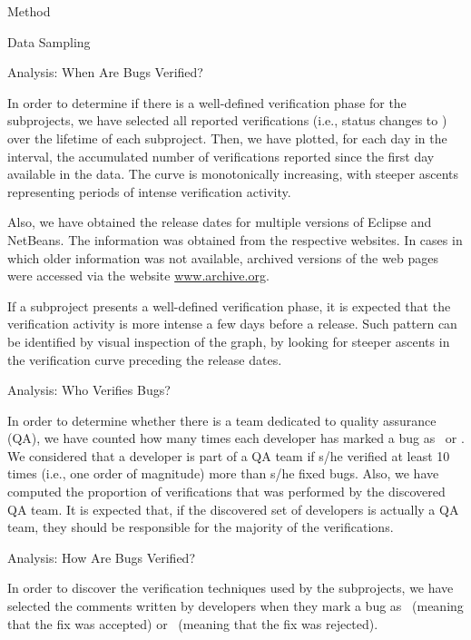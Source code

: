 \begin{section}{Method}
\begin{subsection}{Data Sampling}
\end{subsection}

\begin{subsection}{Analysis: When Are Bugs Verified?}
	
	In order to determine if there is a well-defined verification phase for the subprojects, we have selected all reported verifications (i.e., status changes to \VERIFIED) over the lifetime of each subproject. Then, we have plotted, for each day in the interval, the accumulated number of verifications reported since the first day available in the data. The curve is monotonically increasing, with steeper ascents representing periods of intense verification activity.
	
	Also, we have obtained the release dates for multiple versions of Eclipse and NetBeans. The information was obtained from the respective websites. In cases in which older information was not available, archived versions of the web pages were accessed via the website \url{www.archive.org}.
	
	If a subproject presents a well-defined verification phase, it is expected that the verification activity is more intense a few days before a release. Such pattern can be identified by visual inspection of the graph, by looking for steeper ascents in the verification curve preceding the release dates.
	
\end{subsection}

\begin{subsection}{Analysis: Who Verifies Bugs?}
	
	In order to determine whether there is a team dedicated to quality assurance (QA), we have counted how many times each developer has marked a bug as \FIXED\ or \VERIFIED. We considered that a developer is part of a QA team if s/he verified at least 10 times (i.e., one order of magnitude) more than s/he fixed bugs. Also, we have computed the proportion of verifications that was performed by the discovered QA team. It is expected that, if the discovered set of developers is actually a QA team, they should be responsible for the majority of the verifications.
	
\end{subsection}

\begin{subsection}{Analysis: How Are Bugs Verified?}

	In order to discover the verification techniques used by the subprojects, we have selected the comments written by developers when they mark a bug as \VERIFIED\ (meaning that the fix was accepted) or \REOPENED\ (meaning that the fix was rejected). 
	

\end{subsection}
\end{section}
